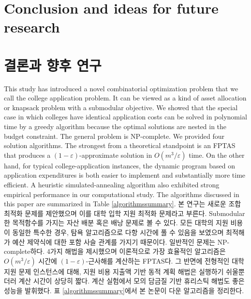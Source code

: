 \documentclass[11pt]{article} %
\theoremstyle{definition}
\theoremstyle{definition}
\begin{document}
\ifen \section{Conclusion and ideas for future research} \else \section{결론과 향후 연구}\fi\label{conclusion}
\ifen
This study has introduced a novel combinatorial optimization problem that we call the college application problem. It can be viewed as a kind of asset allocation or knapsack problem with a submodular objective. We showed that the special case in which colleges have identical application costs can be solved in polynomial time by a greedy algorithm because the optimal solutions are nested in the budget constraint. The general problem is NP-complete. We provided four solution algorithms. The strongest from a theoretical standpoint is an FPTAS that produces a $(1-\varepsilon)$-approximate solution in $O(m^3 / \varepsilon)$ time. On the other hand, for typical college-application instances, the dynamic program based on application expenditures is both easier to implement and substantially more time efficient. A heuristic simulated-annealing algorithm also exhibited strong empirical performance in our computational study. The algorithms discussed in this paper are summarized in Table \ref{algorithmssummary}.
\else
본 연구는 새로운 조합 최적화 문제를 제안했으며 이를 대학 입학 지원 최적화 문제라고 부른다. Submodular한 목적함수를 가지는 자산 배분 혹은 배낭 문제로 볼 수 있다. 모든 대학의 지원 비용이 동일한 특수한 경우, 탐욕 알고리즘으로 다항 시간에 풀 수 있음을 보였으며 최적해가 예산 제약식에 대한 포함 사슬 관계를 가지기 때문이다. 일반적인 문제는 NP-complete하다. 4가지 해법을 제시했으며 이론적으로 가장 효율적인 알고리즘은 $O(m^3 / \varepsilon)$ 시간에  $(1-\varepsilon)$-근사해를 계산하는 FPTAS다. 그 반면에 전형적인 대학 지원 문제 인스턴스에 대해, 지원 비용 지출액 기반 동적 계획 해법은 실행하기 쉬울뿐더러 계산 시간이 상당히 짧다. 계산 실험에서 모의 담금질 기반 휴리스틱 해법도 좋은 성능을 발휘했다. 표 \ref{algorithmssummary}에서 본 논문이 다운 알고리즘을 정리한다.
\fi
\end{document}
